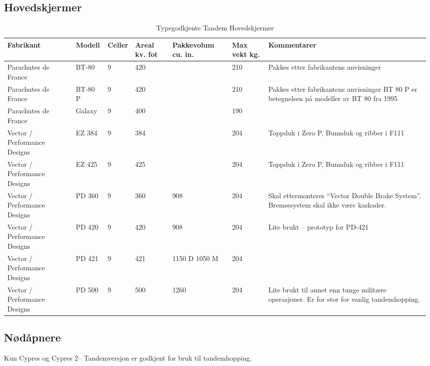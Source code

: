 \subsection{Hovedskjermer}
\begin{table}
	\caption{Typegodkjente Tandem Hovedskjermer}
	\begin{tabular}{ | p{2cm} | p{1cm} | p{1cm} | p{1cm} | p{1cm} | p{1cm} | p{3cm} | }
		\hline
		Fabrikant & Modell & Celler & Areal kv. fot & Pakkevolum cu. in. & Max vekt kg. & Kommentarer \\
		\hline
		Parachutes de France & BT-80 & 9 & 420 & & 210 & Pakkes etter fabrikantens anvisninger \\
		\hline
		Parachutes de France & BT-80 P & 9 & 420 & & 210 & Pakkes etter fabrikantens anvisninger
		BT 80 P er betegnelsen på modeller av BT 80 fra 1995 \\
		\hline
		Parachutes de France & Galaxy & 9 & 400 & & 190 & \\
		\hline
		Vector / Performance Designs & EZ 384 & 9 & 384 & & 204\footnotemark & Toppduk i Zero P, Bunnduk og ribber i F111 \\
		\hline
		Vector / Performance Designs & EZ 425 & 9 & 425 & & 204 & Toppduk i Zero P, Bunnduk og ribber i F111 \\
		\hline
		Vector / Performance Designs & PD 360 & 9 & 360 & 908 & 204 & Skal ettermonteres ``Vector Double Brake System''.
		Bremsesystem skal ikke være kaskader. \\
		\hline
		Vector / Performance Designs & PD 420 & 9 & 420 & 908 & 204 & Lite brukt – prototyp for PD-421 \\
		\hline
		Vector / Performance Designs & PD 421 & 9 & 421 & 1150 D 1050 M\footnotemark & 204 & \\
		\hline
		Vector / Performance Designs & PD 500 & 9 & 500 & 1260 & 204 & Lite brukt til annet enn tunge militære operasjoner. Er for stor for vanlig tandemhopping. \\
		\hline
	\end{tabular}
\end{table}

\subsection{Nødåpnere}
Kun Cypres og Cypres 2– Tandemversjon er godkjent for bruk til tandemhopping.

